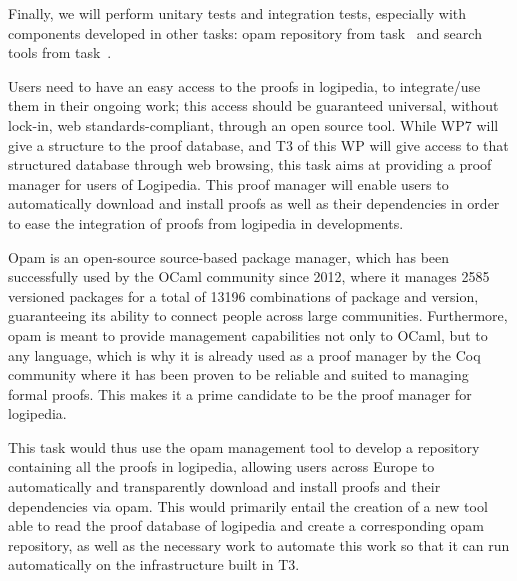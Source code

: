 \begin{workpackage}[id=access,wphases=0-48,type=MGT,
  short=Access,%
  title={Access to the infrastructure},
  lead=Irt,IrtRM=23,OcaRM=6,EduRM=12,InrRM=18]
\begin{tasklist}
\begin{task}[id=web,
      title=Giving access to the infrastructure on the world-wide web,
      lead=Irt,IrtRM=18]
    Finally, we will perform unitary tests and integration tests,
    especially with components developed in other tasks: opam
    repository from task~ and search tools from
    task~.
  \end{task}

  \begin{task}[id=opam,
      title=Giving access to the infrastructure in proof tools,
      lead=Oca,
      OcaRM=6]
    Users need to have an easy access to the proofs in logipedia, to
    integrate/use them in their ongoing work; this access should be
    guaranteed universal, without lock-in, web standards-compliant,
    through an open source tool. While WP7 will give a structure to
    the proof database, and T3 of this WP will give access to that
    structured database through web browsing, this task aims at
    providing a proof manager for users of Logipedia. This proof
    manager will enable users to automatically download and install
    proofs as well as their dependencies in order to ease the
    integration of proofs from logipedia in developments.

    Opam\cite{OPAM} is an open-source source-based package manager,
    which has been successfully used by the OCaml community since
    2012, where it manages 2585 versioned packages for a total of
    13196 combinations of package and version, guaranteeing its
    ability to connect people across large communities. Furthermore,
    opam is meant to provide management capabilities not only to
    OCaml, but to any language, which is why it is already used as a
    proof manager by the Coq community where it has been proven to be
    reliable and suited to managing formal proofs. This makes it a
    prime candidate to be the proof manager for logipedia.

    This task would thus use the opam management tool to develop a
    repository containing all the proofs in logipedia, allowing users
    across Europe to automatically and transparently download and
    install proofs and their dependencies via opam. This would
    primarily entail the creation of a new tool able to read the proof
    database of logipedia and create a corresponding opam repository,
    as well as the necessary work to automate this work so that it can
    run automatically on the infrastructure built in T3.
  \end{task}


\end{tasklist}
\end{workpackage}
